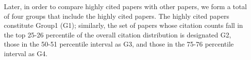 Later, in order to compare highly cited papers with other papers, we form a total of four groups that include the highly cited papers. The highly cited papers constitute Group1 (G1); similarly, the set of papers whose citation counts fall in the top 25-26 percentile of the overall citation distribution is designated G2, those in the 50-51 percentile interval as G3, and those in the 75-76 percentile interval as G4.
